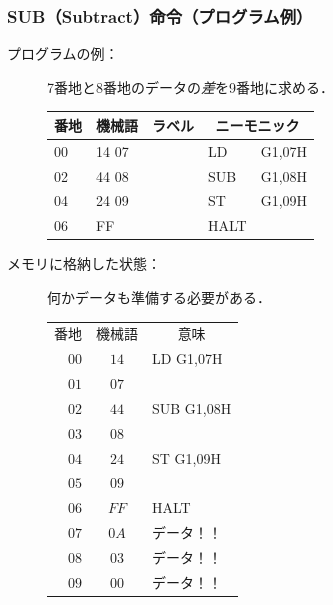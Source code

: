 \documentclass{beamer}                 %
\begin{document}
\begin{frame}
  \frametitle{SUB（Subtract）命令（プログラム例）}
  \begin{description}
  \item[プログラムの例：]7番地と8番地のデータの\emph{差}を9番地に求める．\\
    {\ttfamily\small\begin{center}
      \begin{tabular}{|l|l|l|l l|} \hline
        番地 & 機械語 & ラベル & \multicolumn{2}{|c|}{ニーモニック} \\
        \hline
        00 & 14 07 & & LD   & G1,07H \\
        02 & 44 08 & & SUB  & G1,08H \\
        04 & 24 09 & & ST   & G1,09H \\
        06 & FF    & & HALT & \\
        \hline
      \end{tabular}
    \end{center}}
    \vfill

    \item[メモリに格納した状態：] 何かデータも準備する必要がある．
      {\ttfamily\small\begin{center}
        \begin{tabular}{r|c|l}
          \multicolumn{1}{c}{番地} &
          \multicolumn{1}{c}{機械語} &
          \multicolumn{1}{c}{意味} \\
          \cline{2-2}
          $00$ & $14$ & LD G1,07H \\
          \cline{2-2}
          $01$ & $07$ &           \\
          \cline{2-2}
          $02$ & $44$ & SUB G1,08H \\
          \cline{2-2}
          $03$ & $08$ &           \\
          \cline{2-2}
          $04$ & $24$ & ST G1,09H \\
          \cline{2-2}
          $05$ & $09$ &           \\
          \cline{2-2}
          $06$ & $FF$ & HALT      \\
          \cline{2-2}
          $07$ & $0A$ & データ！！\\
          \cline{2-2}
          $08$ & $03$ & データ！！\\
          \cline{2-2}
          $09$ & $00$ & データ！！\\
          \cline{2-2}
        \end{tabular}
      \end{center}}
      \vfill

  \end{description}
\end{frame}
\end{document}
